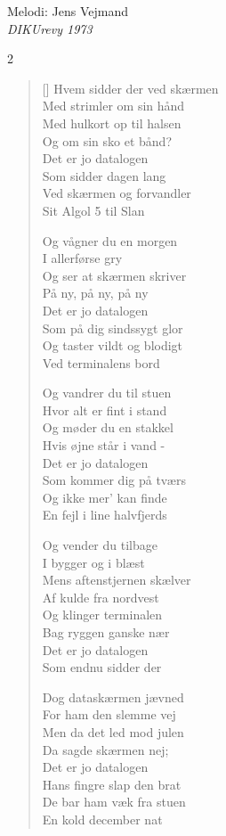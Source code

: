 \newpage

{Melodi: Jens Vejmand}\\[.2em]
{\small\itshape DIKUrevy 1973}
\begin{multicols}2
\settowidth{\versewidth}{Hvem sidder der ved skærmen}
\begin{verse}[\versewidth]
Hvem sidder der ved skærmen\\
Med strimler om sin hånd\\
Med hulkort op til halsen\\
Og om sin sko et bånd?\\
Det er jo datalogen\\
Som sidder dagen lang\\
Ved skærmen og forvandler\\
Sit Algol 5 til Slan

Og vågner du en morgen\\
I allerførse gry\\
Og ser at skærmen skriver\\
På ny, på ny, på ny\\
Det er jo datalogen\\
Som på dig sindssygt glor\\
Og taster vildt og blodigt\\
Ved terminalens bord

Og vandrer du til stuen\\
Hvor alt er fint i stand\\
Og møder du en stakkel\\
Hvis øjne står i vand -\\
Det er jo datalogen\\
Som kommer dig på tværs\\
Og ikke mer' kan finde\\
En fejl i line halvfjerds

Og vender du tilbage\\
I bygger og i blæst\\
Mens aftenstjernen skælver\\
Af kulde fra nordvest\\
Og klinger terminalen\\
Bag ryggen ganske nær\\
Det er jo datalogen\\
Som endnu sidder der

Dog dataskærmen jævned\\
For ham den slemme vej\\
Men da det led mod julen\\
Da sagde skærmen nej;\\
Det er jo datalogen\\
Hans fingre slap den brat\\
De bar ham væk fra stuen\\
En kold december nat


\end{verse}
\end{multicols}
